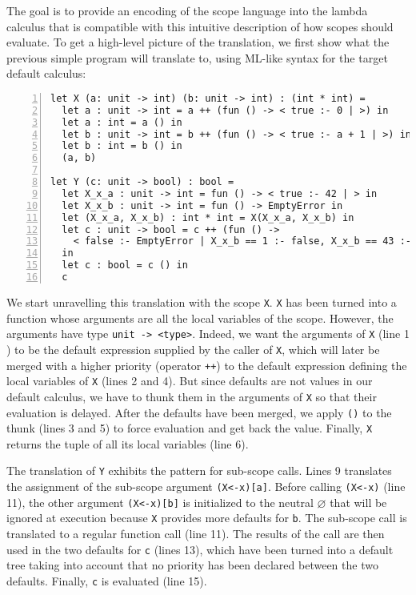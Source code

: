 \documentclass[11pt,a4paper]{article}
\newcommand{\synvar}[1]{\ensuremath{#1}}
\newcommand{\synemptydefault}{\synvar{\varnothing}}
\begin{document}
The goal is to provide an encoding of the scope language 
into the lambda calculus that is compatible with this intuitive description 
of how scopes should evaluate. To get a high-level 
picture of the translation, we first show what the previous simple program will translate 
to, using ML-like syntax for the target default calculus:
\begin{Verbatim}[frame=lines,label=Simple default program, numbers=left, framesep=10pt]
let X (a: unit -> int) (b: unit -> int) : (int * int) =
  let a : unit -> int = a ++ (fun () -> < true :- 0 | >) in
  let a : int = a () in  
  let b : unit -> int = b ++ (fun () -> < true :- a + 1 | >) in 
  let b : int = b () in
  (a, b)

let Y (c: unit -> bool) : bool = 
  let X_x_a : unit -> int = fun () -> < true :- 42 | > in
  let X_x_b : unit -> int = fun () -> EmptyError in 
  let (X_x_a, X_x_b) : int * int = X(X_x_a, X_x_b) in 
  let c : unit -> bool = c ++ (fun () -> 
    < false :- EmptyError | X_x_b == 1 :- false, X_x_b == 43 :- true >)
  in 
  let c : bool = c () in 
  c 
\end{Verbatim}

We start unravelling this translation with the scope \Verb+X+. \Verb+X+ has 
been turned into a function whose arguments are all the local variables of the 
scope. However, the arguments have type \Verb+unit -> <type>+. Indeed, we want the 
arguments of \Verb+X+ (line 1 ) to be the default expression supplied by the caller of
\Verb+X+, which will later be merged with a higher priority (operator \Verb|++|) to the default 
expression defining the local variables of \Verb+X+ (lines 2 and 4). But since defaults are not 
values in our default calculus, we have to thunk them in the arguments of \Verb|X| 
so that their evaluation is delayed. After the defaults have been merged, we apply 
\Verb+()+ to the thunk (lines 3 and 5) to force evaluation and get back the value.
Finally, \Verb+X+ returns the tuple of all its local variables (line 6).

The translation of \Verb+Y+ exhibits the pattern for sub-scope calls.
Lines 9 translates the assignment of the sub-scope argument \Verb+(X<-x)[a]+.
Before calling \Verb+(X<-x)+ (line 11), the other argument \Verb+(X<-x)[b]+ is 
initialized to the neutral \synemptydefault{} that will be ignored at execution 
because \Verb+X+ provides more defaults for \Verb+b+.
The sub-scope call is translated to a regular 
function call (line 11). The results of the call are then used in the two defaults  
for \Verb+c+ (lines 13), which have been turned into a default tree taking into 
account that no priority has been declared between the two defaults.
 Finally, \Verb+c+ is evaluated (line 15). 
\end{document}
